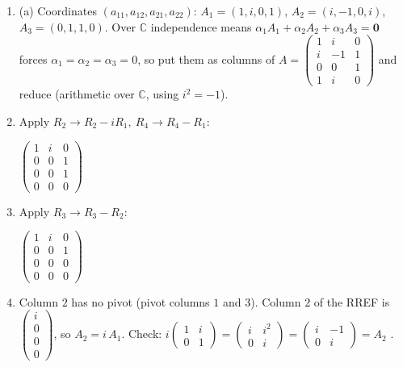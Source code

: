 \documentclass[11pt]{article}
\begin{document}
\begin{tcolorbox}[breakable,colback=ans,colframe=ansb,boxrule=0.5pt,left=4pt,right=4pt,top=2pt,bottom=2pt]\begin{enumerate}[leftmargin=3.1em,itemsep=1pt,topsep=1pt,label=\textbf{Step \arabic*.}]\item (a) Coordinates $(a_{11},a_{12},a_{21},a_{22})$: $A_1=(1,i,0,1)$, $A_2=(i,-1,0,i)$, $A_3=(0,1,1,0)$. Over $\mathbb{C}$ independence means $\alpha_1A_1+\alpha_2A_2+\alpha_3A_3=\mathbf 0$ forces $\alpha_1=\alpha_2=\alpha_3=0$, so put them as columns of $A=\begin{pmatrix}1 & i & 0 \\ i & -1 & 1 \\ 0 & 0 & 1 \\ 1 & i & 0\end{pmatrix}$ and reduce (arithmetic over $\mathbb{C}$, using $i^{2}=-1$).
\item Apply $R_2\to R_2-iR_1,\ R_4\to R_4-R_1$:\par\smallskip $\displaystyle \begin{pmatrix}1 & i & 0 \\ 0 & 0 & 1 \\ 0 & 0 & 1 \\ 0 & 0 & 0\end{pmatrix}$
\item Apply $R_3\to R_3-R_2$:\par\smallskip $\displaystyle \begin{pmatrix}1 & i & 0 \\ 0 & 0 & 1 \\ 0 & 0 & 0 \\ 0 & 0 & 0\end{pmatrix}$
\item Column $2$ has no pivot (pivot columns $1$ and $3$). Column $2$ of the RREF is $\begin{pmatrix}i\\0\\0\\0\end{pmatrix}$, so $A_2=i\,A_1$. Check: $i\begin{pmatrix}1&i\\0&1\end{pmatrix}=\begin{pmatrix}i&i^{2}\\0&i\end{pmatrix}=\begin{pmatrix}i&-1\\0&i\end{pmatrix}=A_2$ \checkmark.

\end{enumerate}
\end{tcolorbox}
\end{document}
